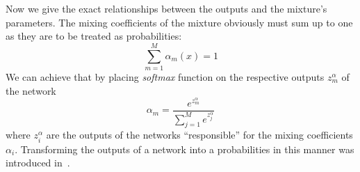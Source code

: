\documentclass[12pt,a4paper,twoside]{scrartcl}
\numberwithin{equation}{section}
\begin{document}
Now we give the exact relationships between the outputs and the mixture's parameters. The mixing coefficients of the mixture obviously must sum up to one as they are to be treated as probabilities:
\begin{equation}
\sum_{m=1}^M\alpha_m(x)=1
\end{equation}
We can achieve that by placing \emph{softmax} function on the respective outputs \(z_m^{\alpha} \) of the network 
\begin{equation}
 \alpha_m = \frac{e^{z_m^{\alpha}}}{\sum_{j=1}^M e^{z_j^{\alpha}}}
\end{equation}
where \(z_i^{\alpha}\) are the outputs of the networks ``responsible'' for the mixing coefficients \(\alpha_i\). Transforming the outputs of a network into a probabilities in this manner was introduced in~\cite{bridle1990}.
\end{document}
